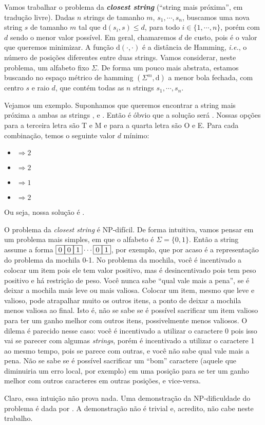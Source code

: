 Vamos trabalhar o problema da \textbf{\textit{closest string}} (``string mais próxima'', em tradução livre). Dadas $n$ strings de tamanho $m$, $s_1, \cdots, s_n$, buscamos uma nova string $s$ de tamanho $m$ tal que $\text{d}(s_i, s) \le d$, para todo $i \in \{1, \cdots, n\}$, porém com $d$ sendo o menor valor possível. Em geral, chamaremos $d$ de custo, pois é o valor que queremos minimizar. A função $\text{d}(\cdot, \cdot)$ é a distância de Hamming, \textit{i.e.}, o número de posições diferentes entre duas strings. Vamos considerar, neste problema, um alfabeto fixo $\Sigma$.
De forma um pouco mais abstrata, estamos buscando no espaço métrico de hamming $\left(\Sigma^m, \text{d}\right)$ a menor bola fechada, com centro $s$ e raio $d$, que contém todas as $n$ strings $s_1, \cdots, s_n$.

Vejamos um exemplo. Suponhamos que queremos encontrar a string mais próxima a ambas as strings ,  e . Então é óbvio que a solução será . Nossas opções para a terceira letra são T e M e para a quarta letra são O e E. Para cada combinação, temos o seguinte valor $d$ mínimo:
\begin{itemize}
    \item {} $\Rightarrow 2$
    \item {} $\Rightarrow 2$
    \item {} $\Rightarrow 1$
    \item {} $\Rightarrow 2$
\end{itemize}
Ou seja, nossa solução é .

O problema da \textit{closest string} é NP-difícil.
De forma intuitiva, vamos pensar em um problema mais simples, em que o alfabeto é $\Sigma = \{0, 1\}$. Então a string assume a forma $\textsc{\fbox{0}}\textsc{\fbox{0}}\textsc{\fbox{1}} \cdots \textsc{\fbox{0}}\textsc{\fbox{1}}$, por exemplo, que por acaso é a representação do problema da mochila 0-1. No problema da mochila, você é incentivado a colocar um item pois ele tem valor positivo, mas é desincentivado pois tem peso positivo e há restrição de peso. Você nunca sabe ``qual vale mais a pena'', se é deixar a mochila mais leve ou mais valiosa. Colocar um item, mesmo que leve e valioso, pode atrapalhar muito os outros itens, a ponto de deixar a mochila menos valiosa ao final. Isto é, não se sabe se é possível sacrificar um item valioso para ter um ganho melhor com outros itens, possivelmente menos valiosos. O dilema é parecido nesse caso: você é incentivado a utilizar o caractere 0 pois isso vai se parecer com algumas \textit{strings}, porém é incentivado a utilizar o caractere 1 ao mesmo tempo, pois se parece com outras, e você não sabe qual vale mais a pena. Não se sabe se é possível sacrificar um ``bom'' caractere (aquele que diminuiria um erro local, por exemplo) em uma posição para se ter um ganho melhor com outros caracteres em outras posições, e vice-versa.

Claro, essa intuição não prova nada. Uma demonstração da NP-dificuldade do problema é dada por \citeauthor{frances1997covering} \cite{frances1997covering}. A demonstração não é trivial e, acredito, não cabe neste trabalho.